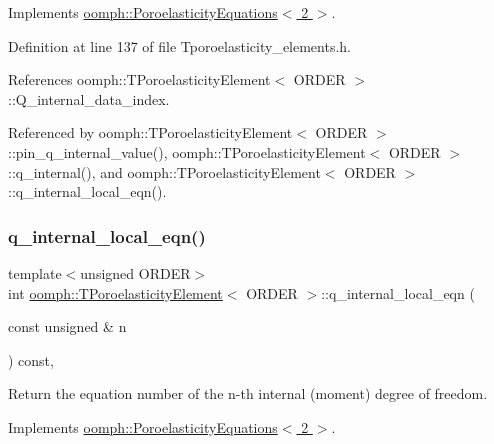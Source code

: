 Implements \hyperlink{classoomph_1_1PoroelasticityEquations_a51f9afadce69aeb1ca777d5266f5c4d2}{oomph\+::\+Poroelasticity\+Equations$<$ 2 $>$}.



Definition at line 137 of file Tporoelasticity\+\_\+elements.\+h.



References oomph\+::\+T\+Poroelasticity\+Element$<$ O\+R\+D\+E\+R $>$\+::\+Q\+\_\+internal\+\_\+data\+\_\+index.



Referenced by oomph\+::\+T\+Poroelasticity\+Element$<$ O\+R\+D\+E\+R $>$\+::pin\+\_\+q\+\_\+internal\+\_\+value(), oomph\+::\+T\+Poroelasticity\+Element$<$ O\+R\+D\+E\+R $>$\+::q\+\_\+internal(), and oomph\+::\+T\+Poroelasticity\+Element$<$ O\+R\+D\+E\+R $>$\+::q\+\_\+internal\+\_\+local\+\_\+eqn().

\mbox{\label{classoomph_1_1TPoroelasticityElement_a6e45ef2eff3ba7ba401a1502760c7724}} 
\subsubsection{\texorpdfstring{q\+\_\+internal\+\_\+local\+\_\+eqn()}{q\_internal\_local\_eqn()}}
{\footnotesize\ttfamily template$<$unsigned O\+R\+D\+ER$>$ \\
int \hyperlink{classoomph_1_1TPoroelasticityElement}{oomph\+::\+T\+Poroelasticity\+Element}$<$ O\+R\+D\+ER $>$\+::q\+\_\+internal\+\_\+local\+\_\+eqn (\begin{DoxyParamCaption}\item[{const unsigned \&}]{n }\end{DoxyParamCaption}) const\hspace{0.3cm}{\ttfamily [inline]}, {\ttfamily [virtual]}}



Return the equation number of the n-\/th internal (moment) degree of freedom. 



Implements \hyperlink{classoomph_1_1PoroelasticityEquations_a432e37d70b8fd6c643946609d5e92ddd}{oomph\+::\+Poroelasticity\+Equations$<$ 2 $>$}.



